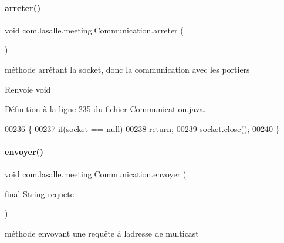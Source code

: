 \paragraph{\texorpdfstring{arreter()}{arreter()}}
{\footnotesize\ttfamily void com.\+lasalle.\+meeting.\+Communication.\+arreter (\begin{DoxyParamCaption}{ }\end{DoxyParamCaption})}



méthode arrétant la socket, donc la communication avec les portiers 

\begin{DoxyReturn}{Renvoie}
void 
\end{DoxyReturn}


Définition à la ligne \hyperlink{_communication_8java_source_l00235}{235} du fichier \hyperlink{_communication_8java_source}{Communication.\+java}.


\begin{DoxyCode}
00236     \{
00237         \textcolor{keywordflow}{if}(\hyperlink{classcom_1_1lasalle_1_1meeting_1_1_communication_a2a538f36640aecebbb833bbaf1f03858}{socket} == null)
00238             \textcolor{keywordflow}{return};
00239         \hyperlink{classcom_1_1lasalle_1_1meeting_1_1_communication_a2a538f36640aecebbb833bbaf1f03858}{socket}.close();
00240     \}
\end{DoxyCode}
\mbox{\label{classcom_1_1lasalle_1_1meeting_1_1_communication_a1566200ca56ba63eec13d0ce37e6c7ee}} 
\paragraph{\texorpdfstring{envoyer()}{envoyer()}\hspace{0.1cm}{\footnotesize\ttfamily [1/2]}}
{\footnotesize\ttfamily void com.\+lasalle.\+meeting.\+Communication.\+envoyer (\begin{DoxyParamCaption}\item[{final String}]{requete }\end{DoxyParamCaption})}



méthode envoyant une requête à l\textquotesingle{}adresse de multicast 


